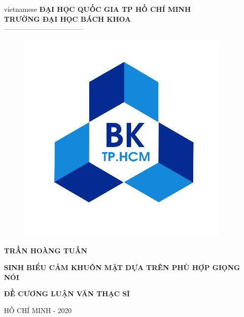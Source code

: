 \begin{titlepage}
\begin{center}

\vspace*{3\bigskipamount}

\begin{otherlanguage*}{vietnamese}
\makeatletter
\fontsize{12}{12}\textbf{ĐẠI HỌC QUỐC GIA TP HỒ CHÍ MINH}\\
\fontsize{14}{14}\textbf{TRƯỜNG ĐẠI HỌC BÁCH KHOA}\\
\fontsize{14}{14} -----------------------------------
\makeatother

\begin{figure}[h]
	\centering
		\includegraphics[width=0.4\columnwidth]{./title/bach_khoa.jpeg}
		\centering
	\label{fig:logo}
\end{figure}

{\makeatletter
\fontsize{16}{16}\textbf{TRẦN HOÀNG TUẤN}\\
\makeatother}

\vspace{1.2cm}

{\makeatletter
\fontsize{18}{18}\textbf{SINH BIỂU CẢM KHUÔN MẶT DỰA TRÊN PHÙ HỢP GIỌNG NÓI}\\
\makeatother}

\vspace{1.2cm}
{\makeatletter
\fontsize{18}{18}\textbf{ĐỀ CƯƠNG LUẬN VĂN THẠC SĨ}\\
\makeatother}


\vspace{8cm}
{\makeatletter
\fontsize{12}{12} HỒ CHÍ MINH - 2020\\
\makeatother}

\end{otherlanguage*}

\end{center}
\end{titlepage}


